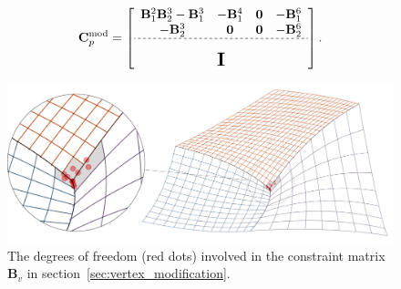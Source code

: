 \begin{equation}
  \mathbf{C}^\text{mod}_p =
  \left[\begin{array}{cccc}
      {\mathbf{B}}_1^2{\mathbf{B}}_2^3-{\mathbf{B}}_1^3 & -{\mathbf{B}}_1^4 & \mathbf{0} & -{\mathbf{B}}_1^6 \\
      -{\mathbf{B}}_2^3                                 & \mathbf{0}        & \mathbf{0} & -{\mathbf{B}}_2^6 \\ \hdashline[2pt/2pt]
      \multicolumn{4}{c}{\multirow{3}{*}{\raisebox{0mm}{\scalebox{1.5}{$\mathbf{I}$}}}}                      \\
                                                        &                   &            &
    \end{array}\right].\label{eq:nullspace_modification}
\end{equation}

\begin{figure}[ht]
  \centering
  \includegraphics[width=\linewidth]{mesh_spy_modify}
  \caption{The degrees of freedom (red dots) involved in the constraint matrix $\mathbf{B}_v$ in section~\ref{sec:vertex_modification}.}\label{fig:cross_point_dof_modify}
\end{figure}

